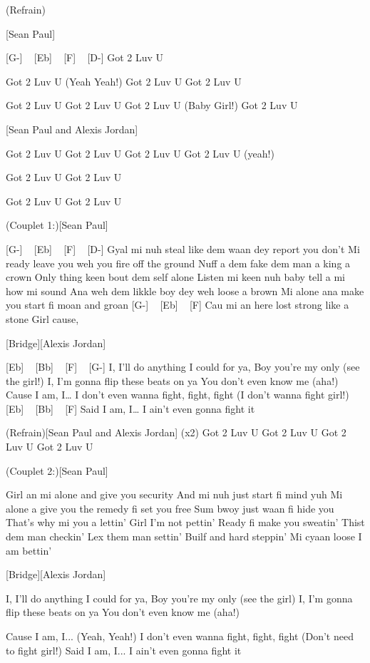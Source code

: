 
(Refrain)

[Sean Paul]

[G-] ~ [Eb] ~ [F] ~ [D-] 
Got 2 Luv U

Got 2 Luv U (Yeah Yeah!)
Got 2 Luv U
Got 2 Luv U

Got 2 Luv U
Got 2 Luv U
Got 2 Luv U (Baby Girl!)
Got 2 Luv U

[Sean Paul and Alexis Jordan]

Got 2 Luv U
Got 2 Luv U
Got 2 Luv U
Got 2 Luv U (yeah!)

Got 2 Luv U
Got 2 Luv U

Got 2 Luv U
Got 2 Luv U

(Couplet 1:)[Sean Paul]

[G-] ~ [Eb] ~ [F] ~ [D-] 
Gyal mi nuh steal like dem waan dey report you don't
Mi ready leave you weh you fire off the ground
Nuff a dem fake dem man a king a crown
Only thing keen bout dem self alone
Listen mi keen nuh baby tell a mi how mi sound
Ana weh dem likkle boy dey weh loose a brown
Mi alone ana make you start fi moan and groan
[G-] ~ [Eb] ~ [F]
Cau mi an here lost strong like a stone
Girl cause,

[Bridge][Alexis Jordan]

[Eb] ~ [Bb] ~ [F] ~ [G-]
I, I’ll do anything I could for ya,
Boy you’re my only (see the girl!)
I, I’m gonna flip these beats on ya
You don’t even know me (aha!)
Cause I am, I…
I don’t even wanna fight, fight, fight (I don't wanna fight girl!)
[Eb] ~ [Bb] ~ [F]
Said I am, I…
I ain’t even gonna fight it

(Refrain)[Sean Paul and Alexis Jordan] (x2)
Got 2 Luv U
Got 2 Luv U
Got 2 Luv U
Got 2 Luv U

(Couplet 2:)[Sean Paul]


Girl an mi alone and give you security
And mi nuh just start fi mind yuh
Mi alone a give you the remedy fi set you free
Sum bwoy just waan fi hide you
That's why mi you a lettin'
Girl I'm not pettin'
Ready fi make you sweatin'
Thist dem man checkin'
Lex them man settin'
Builf and hard steppin'
Mi cyaan loose I am bettin'

[Bridge][Alexis Jordan]

I, I’ll do anything I could for ya,
Boy you’re my only (see the girl)
I, I’m gonna flip these beats on ya
You don’t even know me (aha!)

Cause I am, I... (Yeah, Yeah!)
I don’t even wanna fight, fight, fight (Don't need to fight girl!)
Said I am, I...
I ain’t even gonna fight it

